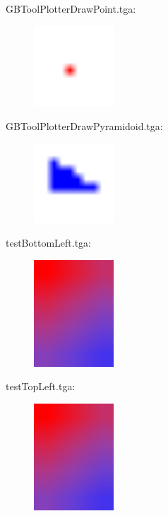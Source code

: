 GBToolPlotterDrawPoint.tga:\\
\begin{center}
\begin{figure}[H]
\centering\includegraphics[width=3cm]{./GBToolPlotterDrawPoint.png}\\
\end{figure}
\end{center}

GBToolPlotterDrawPyramidoid.tga:\\
\begin{center}
\begin{figure}[H]
\centering\includegraphics[width=3cm]{./GBToolPlotterDrawPyramidoid.png}\\
\end{figure}
\end{center}

testBottomLeft.tga:\\
\begin{center}
\begin{figure}[H]
\centering\includegraphics[width=3cm]{./testBottomLeft.png}\\
\end{figure}
\end{center}

testTopLeft.tga:\\
\begin{center}
\begin{figure}[H]
\centering\includegraphics[width=3cm]{./testTopLeft.png}\\
\end{figure}
\end{center}

